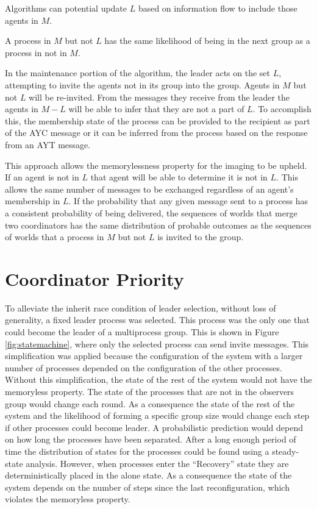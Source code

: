Algorithms can potential update $L$ based on information flow to include those agents in $M$.

\begin{thm}
A process in $M$ but not $L$ has the same likelihood of being in the next group as a process in not in $M$.
\end{thm}

In the maintenance portion of the algorithm, the leader acts on the set $L$, attempting to invite the agents not in its group into the group. Agents in $M$ but not $L$ will be re-invited. From the messages they receive from the leader the agents in $M-L$ will be able to infer that they are not a part of $L$. To accomplish this, the membership state of the process can be provided to the recipient as part of the \ac{AYC} message or it can be inferred from the process based on the response from an \ac{AYT} message.

This approach allows the memorylessness property for the imaging to be upheld. If an agent is not in $L$ that agent will be able to determine it is not in $L$. This allows the same number of messages to be exchanged regardless of an agent's membership in $L$. If the probability that any given message sent to a process has a consistent probability of being delivered, the sequences of worlds that merge two coordinators has the same distribution of probable outcomes as the sequences of worlds that a process in $M$ but not $L$ is invited to the group.

\section{Coordinator Priority}

To alleviate the inherit race condition of leader selection, without loss of generality, a fixed leader process was selected.
This process was the only one that could become the leader of a multiprocess group.
This is shown in Figure \ref{fig:statemachine}, where only the selected process can send invite messages.
This simplification was applied because the configuration of the system with a larger number of processes depended on the configuration of the other processes.
Without this simplification, the state of the rest of the system would not have the memoryless property.
The state of the processes that are not in the observers group would change each round.
As a consequence the state of the rest of the system and the likelihood of forming a specific group size would change each step if other processes could become leader.
A probabilistic prediction would depend on how long the processes have been separated.
After a long enough period of time the distribution of states for the processes could be found using a steady-state analysis.
However, when processes enter the ``Recovery'' state they are deterministically placed in the alone state.
As a consequence the state of the system depends on the number of steps since the last reconfiguration, which violates the memoryless property.

